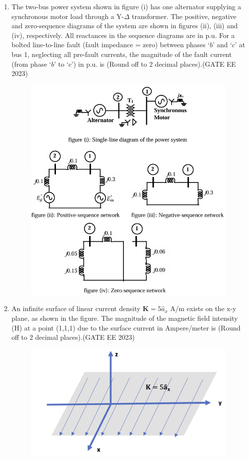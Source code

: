 \documentclass[a4paper,12pt]{exam}
\theoremstyle{remark}
\begin{document}
\begin{enumerate}
\item The two-bus power system shown in figure (i) has one alternator supplying a synchronous motor load through a Y-$\Delta$ transformer. The positive, negative and zero-sequence diagrams of the system are shown in figures (ii), (iii) and (iv), respectively. All reactances in the sequence diagrams are in p.u. For a bolted line-to-line fault (fault impedance = zero) between phases `$b$' and `$c$' at bus 1, neglecting all pre-fault currents, the magnitude of the fault current (from phase `$b$' to `$c$') in p.u. is \underline{\hspace{3cm}} (Round off to 2 decimal places).\hfill{(GATE EE 2023)}
\begin{figure}[H]
    \centering
    \includegraphics[width=0.7\columnwidth]{figs/Q 60.png}
    \caption{}
    \label{fig:placeholder}
\end{figure}

\item An infinite surface of linear current density $\mathbf{K} = 5\hat{a}_x$ A/m exists on the x-y plane, as shown in the figure. The magnitude of the magnetic field intensity (H) at a point (1,1,1) due to the surface current in Ampere/meter is \underline{\hspace{2cm}} (Round off to 2 decimal places).\hfill{(GATE EE 2023)}

\begin{figure}[H]
    \centering
    \includegraphics[width=0.5\columnwidth]{figs/Q 61.png}
    \caption{}
    \label{fig:placeholder}
\end{figure}


\end{enumerate}
\end{document}
